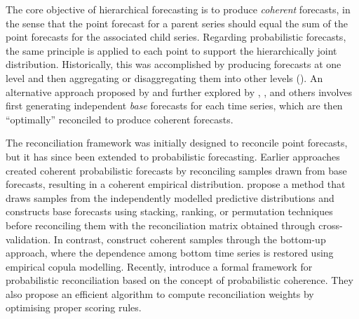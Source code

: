 \documentclass[a4paper,review,12pt,authoryear]{elsarticle}
\begin{document}
The core objective of hierarchical forecasting is to produce \textit{coherent} forecasts, 
in the sense that the point forecast for a parent series should equal the sum of the point forecasts for the associated child series. 
Regarding probabilistic forecasts, the same principle is applied to each point to support the hierarchically joint distribution.
Historically, this was accomplished by producing forecasts at one level 
and then aggregating or disaggregating them into other levels (\citealp{fliednerHierarchicalForecastingIssues2001}). 
An alternative approach proposed by \cite{hyndmanOptimalCombinationForecasts2011} and further explored by \cite{wickramasuriyaOptimalForecastReconciliation2019}, \cite{ anagiotelisForecastReconciliationGeometric2021}, and others involves 
first generating independent \textit{base} forecasts for each time series, 
which are then ``optimally'' reconciled to produce coherent forecasts.

The reconciliation framework was initially designed to reconcile point forecasts, but it has since been extended to probabilistic forecasting. 
Earlier approaches created coherent probabilistic forecasts by reconciling samples drawn from base forecasts, resulting in a coherent empirical distribution.
\cite{jeonProbabilisticForecastReconciliation2019} propose a method that draws samples from the independently modelled predictive distributions and constructs base forecasts using stacking, ranking, or permutation techniques before reconciling them with the reconciliation matrix obtained through cross-validation.
In contrast, \cite{bentaiebHierarchicalProbabilisticForecasting2020} construct coherent samples through the bottom-up approach, 
where the dependence among bottom time series is restored using empirical copula modelling.
Recently, \cite{panagiotelisProbabilisticForecastReconciliation2022} introduce a formal framework for probabilistic reconciliation based on the concept of probabilistic coherence. 
They also propose an efficient algorithm to compute reconciliation weights by optimising proper scoring rules. 
\end{document}
